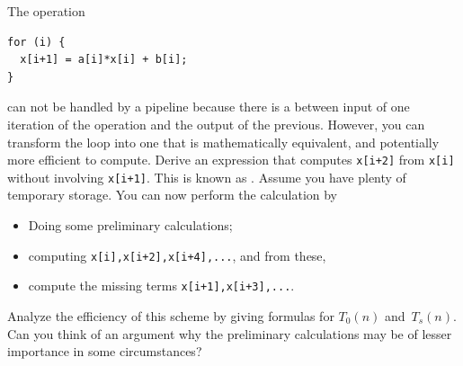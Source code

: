 \begin{exercise}
\label{ex:recursivedoubling}
  The operation
\begin{verbatim}
for (i) {
  x[i+1] = a[i]*x[i] + b[i];
}
\end{verbatim}
  can not be handled by a pipeline because there is
  a  between input of one iteration of the operation
  and the output of the previous.
  However, you can transform the loop into one that is mathematically
  equivalent, and potentially more efficient to compute. Derive an
  expression that computes \texttt{x[i+2]} from \texttt{x[i]} without
  involving \texttt{x[i+1]}. This is known as . Assume you have plenty of temporary storage. You can now
  perform the calculation by
  \begin{itemize}
  \item Doing some preliminary calculations;
  \item computing \texttt{x[i],x[i+2],x[i+4],...}, and from these,
  \item compute the missing terms \texttt{x[i+1],x[i+3],...}.
  \end{itemize}
  Analyze the efficiency of this scheme by giving formulas for
  $T_0(n)$ and~$T_s(n)$. Can you think of an argument
  why the preliminary calculations may be of lesser importance in some
  circumstances?
\end{exercise}

